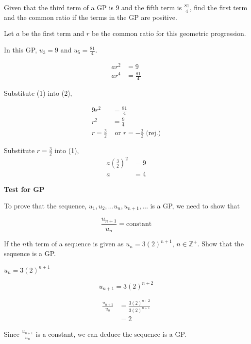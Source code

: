 \documentclass[11pt,a4paper]{book}
\newcommand{\Z}{\mathbb{Z}}
\begin{document}
\begin{example}


Given that the third term of a GP is $9$ and the fifth term is ${\displaystyle \frac{81}{4}}$,
find the first term and the common ratio if the terms in the GP are
positive.

\Solution

Let $a$ be the first term and $r$ be the common ratio for this geometric
progression.

In this GP, $u_{3}=9$ and ${\displaystyle u_{5}=\frac{81}{4}}$.

\begin{align*}
ar^{2} & =9\tag{1}\\
ar^{4} & =\frac{81}{4}\tag{2}
\end{align*}

Substitute (1) into (2),

\begin{align*}
9r^{2} & =\frac{81}{4}\\
r^{2} & =\frac{9}{4}\\
r=\frac{3}{2} & \text{ or }r=-\frac{3}{2}\;\text{(rej.)}
\end{align*}

Substitute ${\displaystyle r=\frac{3}{2}}$ into (1),
\begin{align*}
a\left(\frac{3}{2}\right)^{2} & =9\\
a & =4
\end{align*}

\end{example}


\begin{tcolorbox}[colback=blue!5, colframe=black,boxrule=.4pt, sharpish corners]

\textbf{Test for GP}

\medskip{}

To prove that the sequence, $u_{1},u_{2},\ldots u_{n},u_{n+1},\ldots$
is a GP, we need to show that

\[
\frac{u_{n+1}}{u_{n}}=\text{constant}
\]
\end{tcolorbox}

\begin{example}

If the $n\text{th}$ term of a sequence is given as $u_{n}=3\left(2\right)^{n+1}$,
$n\in\Z^{+}$. Show that the sequence is a GP.

\Solution

$u_{n}=3\left(2\right)^{n+1}$

\[
u_{n+1}=3\left(2\right)^{n+2}
\]

\begin{align*}
\frac{u_{n+1}}{u_{n}} & =\frac{3\left(2\right)^{n+2}}{3\left(2\right)^{n+1}}\\
 & =2
\end{align*}

Since ${\displaystyle \frac{u_{n+1}}{u_{n}}}$ is a constant, we can
deduce the sequence is a GP.

\end{example}
\end{document}
